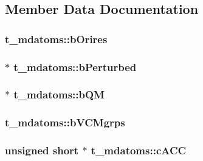 \subsection{\-Member \-Data \-Documentation}
\hypertarget{structt__mdatoms_a4412c8474af1e6626571ea6d66df3765}{
\subsubsection[{b\-Orires}]{ {\bf t\-\_\-mdatoms\-::b\-Orires}}}\label{structt__mdatoms_a4412c8474af1e6626571ea6d66df3765}
\hypertarget{structt__mdatoms_a5798d6b7b373cce9d51b0016950164fd}{
\subsubsection[{b\-Perturbed}]{ $\ast$ {\bf t\-\_\-mdatoms\-::b\-Perturbed}}}\label{structt__mdatoms_a5798d6b7b373cce9d51b0016950164fd}
\hypertarget{structt__mdatoms_a0f8192a96497dc3df4c43d754ff6653d}{
\subsubsection[{b\-Q\-M}]{ $\ast$ {\bf t\-\_\-mdatoms\-::b\-Q\-M}}}\label{structt__mdatoms_a0f8192a96497dc3df4c43d754ff6653d}
\hypertarget{structt__mdatoms_aee2192e9b9995f2a3d59cbeffcd6886b}{
\subsubsection[{b\-V\-C\-Mgrps}]{ {\bf t\-\_\-mdatoms\-::b\-V\-C\-Mgrps}}}\label{structt__mdatoms_aee2192e9b9995f2a3d59cbeffcd6886b}
\hypertarget{structt__mdatoms_a2e1dcb6a2ee6dde005d26390102187ab}{
\subsubsection[{c\-A\-C\-C}]{\setlength{\rightskip}{0pt plus 5cm}unsigned short $\ast$ {\bf t\-\_\-mdatoms\-::c\-A\-C\-C}}}\label{structt__mdatoms_a2e1dcb6a2ee6dde005d26390102187ab}
